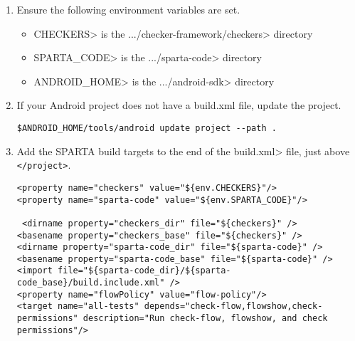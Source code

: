 \begin{enumerate}
\item
Ensure the following environment variables are set. 

\begin{itemize}
\item
\<CHECKERS> is the
\<.../checker-framework/checkers> directory

\item
\<SPARTA\_CODE> is the \<.../sparta-code> directory

\item
\<ANDROID\_HOME> is the \<.../android-sdk> directory

\end{itemize}

\item
If your Android project does not have a build.xml file, update the project.

\begin{Verbatim}
$ANDROID_HOME/tools/android update project --path .
\end{Verbatim}

\item
Add the SPARTA build targets to the end of the \<build.xml>
 file, just above \verb|</project>|.


\begin{Verbatim}
<property name="checkers" value="${env.CHECKERS}"/>
<property name="sparta-code" value="${env.SPARTA_CODE}"/>
	
 <dirname property="checkers_dir" file="${checkers}" />
<basename property="checkers_base" file="${checkers}" />
<dirname property="sparta-code_dir" file="${sparta-code}" />
<basename property="sparta-code_base" file="${sparta-code}" />
<import file="${sparta-code_dir}/${sparta-code_base}/build.include.xml" />
<property name="flowPolicy" value="flow-policy"/>
<target name="all-tests" depends="check-flow,flowshow,check-permissions" description="Run check-flow, flowshow, and check permissions"/>

\end{Verbatim}

\end{enumerate}


